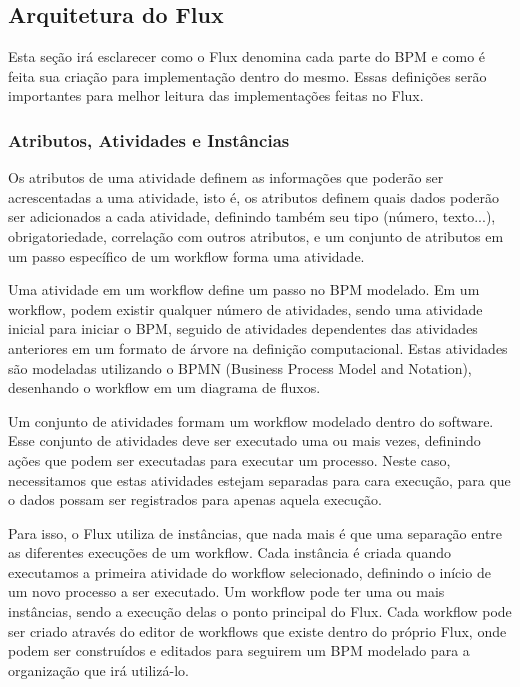\subsection{Arquitetura do Flux}

Esta seção irá esclarecer como o Flux denomina cada parte do BPM e como é feita sua criação para implementação dentro do mesmo. Essas definições serão importantes para melhor leitura das implementações feitas no Flux.

\subsubsection{Atributos, Atividades e Instâncias}

Os atributos de uma atividade definem as informações que poderão ser acrescentadas a uma atividade, isto é, os atributos definem quais dados poderão ser adicionados a cada atividade, definindo também seu tipo (número, texto...), obrigatoriedade, correlação com outros atributos, e um conjunto de atributos em um passo específico de um workflow forma uma atividade.

Uma atividade em um workflow define um passo no BPM modelado. Em um workflow, podem existir qualquer número de atividades, sendo uma atividade inicial para iniciar o BPM, seguido de atividades dependentes das atividades anteriores em um formato de árvore na definição computacional. Estas atividades são modeladas utilizando o BPMN (Business Process Model and Notation), desenhando o workflow em um diagrama de fluxos.

Um conjunto de atividades formam um workflow modelado dentro do software. Esse conjunto de atividades deve ser executado uma ou mais vezes, definindo ações que podem ser executadas para executar um processo. Neste caso, necessitamos que estas atividades estejam separadas para cara execução, para que o dados possam ser registrados para apenas aquela execução.

Para isso, o Flux utiliza de instâncias, que nada mais é que uma separação entre as diferentes execuções de um workflow. Cada instância é criada quando executamos a primeira atividade do workflow selecionado, definindo o início de um novo processo a ser executado. Um workflow pode ter uma ou mais instâncias, sendo a execução delas o ponto principal do Flux.
Cada workflow pode ser criado através do editor de workflows que existe dentro do próprio Flux, onde podem ser construídos e editados para seguirem um BPM modelado para a organização que irá utilizá-lo.

